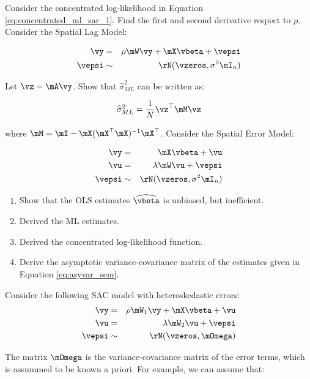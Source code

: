 \documentclass[english,12pt]{book}\usepackage[]{graphicx}\usepackage[]{xcolor}
\begin{document}
\begin{exercises}
    \exercise Consider the concentrated log-likelihood in Equation \eqref{eq:concentrated_ml_sar_1}. Find the first and second derivative respect to $\rho$.
    \exercise Consider the Spatial Lag Model:
  
      \begin{eqnarray*}
      \vy & = & \rho\mW\vy +\mX\vbeta + \vepsi \\
      \vepsi & \sim &\rN(\vzeros, \sigma^2\mI_n)
      \end{eqnarray*}
      
      Let $\vz = \mA\vy$. Show that $\widehat{\sigma}^2_{ML}$ can be written as:
      
      \begin{equation*}
      \widehat{\sigma}^2_{ML} = \frac{1}{N}\vz^\top\mM\vz
      \end{equation*}
      
      where $\mM = \mI - \mX(\mX^\top\mX)^{-1}\mX^\top$. 
    \exercise Consider the Spatial Error Model:
	
	\begin{eqnarray*}
		\vy    & = & \mX\vbeta + \vu \label{eq:sac_eq_1}\\
		\vu & = &\lambda\mW\vu + \vepsi\label{eq:sac_eq_2} \\
		\vepsi & \sim &\rN(\vzeros, \sigma^2\mI_n)
	\end{eqnarray*}
	
	\begin{enumerate}
	  \item Show that the OLS estimates $\widehat{\vbeta}$ is unbiased, but inefficient.
	  \item Derived the ML estimates.
	  \item Derived the concentrated log-likelihood function.
	  \item Derive the asymptotic variance-covariance matrix of the estimates given in Equation \eqref{eq:asyvar_sem}.
	\end{enumerate}
 
 \exercise  Consider the following SAC model with heteroskedastic errors:
 	\begin{eqnarray}
		\vy    & = & \rho \mW_1\vy + \mX\vbeta + \vu \\
		\vu & = &\lambda\mW_2\vu + \vepsi \\
		\vepsi & \sim &\rN(\vzeros, \mOmega)
	\end{eqnarray}
	
	The matrix $\mOmega$ is the variance-covariance matrix of the error terms, which is assummed to be known a priori. For example, we can assume that:
	

\end{exercises}
\end{document}
